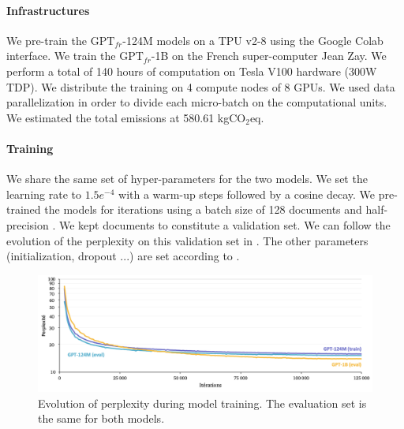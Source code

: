 \paragraph{Infrastructures} We pre-train the $\text{GPT}_{fr}$-124M models on a TPU v2-8 using the Google Colab interface. We train the $\text{GPT}_{fr}$-1B on the French super-computer Jean Zay. We perform a total of 140 hours of computation on Tesla V100 hardware (300W TDP). We distribute the training on 4 compute nodes of 8 GPUs. We used data parallelization in order to divide each micro-batch on the computational units. We estimated the total emissions at 580.61 kgCO$_2$eq.

\paragraph{Training} We share the same set of hyper-parameters for the two models. We set the learning rate to $1.5e^{-4}$ with a  warm-up steps followed by a cosine decay. We pre-trained the models for  iterations using a batch size of 128 documents and half-precision \parencite{micikevicius_18}. We kept  documents to constitute a validation set. We can follow the evolution of the perplexity on this validation set in . The other parameters (initialization, dropout ...) are set according to \textcite{radford_2018}.

\begin{figure}[htbp]
\begin{center}
\includegraphics[width=16cm]{images/ppl-training-5.png}
\end{center}
\caption{Evolution of perplexity during model training. The evaluation set is the same for both models.}
\end{figure}

